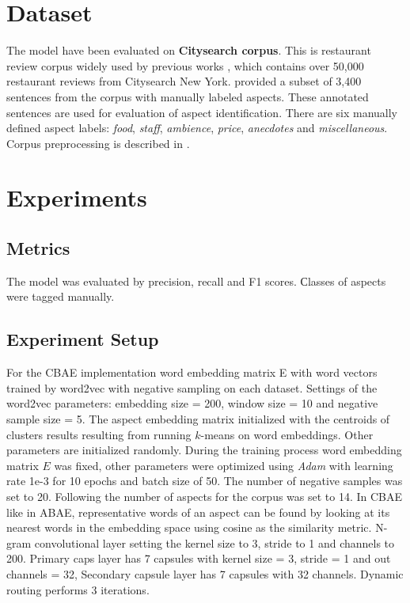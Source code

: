 \documentclass{article}
\begin{document}
\section{Dataset}
The model have been evaluated on \textbf{Citysearch corpus}. This is restaurant review corpus widely used by previous works \cite{Ganu2009BeyondTheStars, Brody2010UAS, Zhao2010JMA}, which contains over 50,000 restaurant reviews from Citysearch New York. \cite{Ganu2009BeyondTheStars} provided a subset of 3,400 sentences from the corpus with manually labeled aspects. These annotated sentences are used for evaluation of aspect identification. There are six manually defined aspect labels: \textit{food}, \textit{staff}, \textit{ambience}, \textit{price}, \textit{anecdotes} and \textit{miscellaneous}. Corpus preprocessing is described in \cite{He2018ABAE}.


\section{Experiments}

\subsection{Metrics}
The model was evaluated by precision, recall and F1 scores. Сlasses of aspects were tagged manually.

\subsection{Experiment Setup}
For the CBAE implementation word embedding matrix E with word vectors trained by word2vec with negative sampling on each dataset. Settings of the word2vec parameters: embedding size = 200, window size = 10 and negative sample size = 5. The aspect embedding matrix initialized with the centroids of clusters results resulting from running $k$-means on word embeddings. Other parameters are initialized randomly. During the training process word embedding matrix $E$ was fixed, other parameters were optimized using \textit{Adam} with learning rate 1e-3 for 10 epochs and batch size of 50. The number of negative samples was set to 20. Following \cite{Brody2010UAS, Zhao2010JMA, He2018ABAE} the number of aspects for the corpus was set to 14. In CBAE like in ABAE, representative  words of an aspect can be found by looking at its nearest words in the embedding space using cosine as the similarity metric. N-gram convolutional layer setting the kernel size to 3, stride to 1 and channels to 200. Primary caps layer has 7 capsules with kernel size = 3, stride = 1 and out channels = 32, Secondary capsule layer has 7 capsules with 32 channels. Dynamic routing performs 3 iterations.
\end{document}
